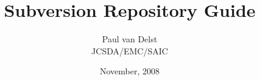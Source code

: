 



\newcommand{\f}[1]{\texttt{#1}}

\title{Subversion Repository Guide}
\author{Paul van Delst\\JCSDA/EMC/SAIC}
\date{November, 2008}



\maketitle



\setcounter{page}{1}
  \tableofcontents\newpage
  \listoffigures\newpage
  \listoftables\newpage
{}
\setcounter{page}{1}






\clearpage



\begin{appendix}
\end{appendix}



